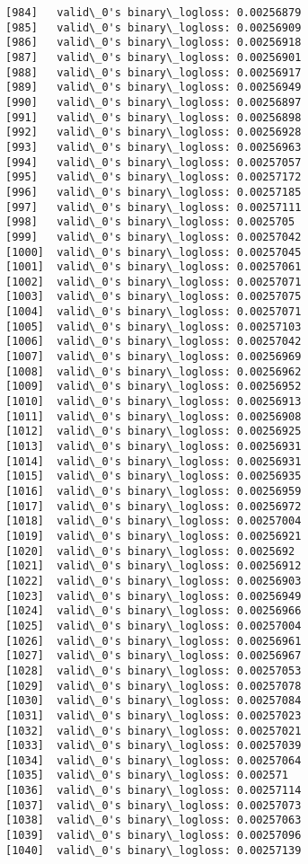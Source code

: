 \documentclass[11pt]{article}
\begin{document}
\begin{Verbatim}[commandchars=\\\{\}]
[984]	valid\_0's binary\_logloss: 0.00256879
[985]	valid\_0's binary\_logloss: 0.00256909
[986]	valid\_0's binary\_logloss: 0.00256918
[987]	valid\_0's binary\_logloss: 0.00256901
[988]	valid\_0's binary\_logloss: 0.00256917
[989]	valid\_0's binary\_logloss: 0.00256949
[990]	valid\_0's binary\_logloss: 0.00256897
[991]	valid\_0's binary\_logloss: 0.00256898
[992]	valid\_0's binary\_logloss: 0.00256928
[993]	valid\_0's binary\_logloss: 0.00256963
[994]	valid\_0's binary\_logloss: 0.00257057
[995]	valid\_0's binary\_logloss: 0.00257172
[996]	valid\_0's binary\_logloss: 0.00257185
[997]	valid\_0's binary\_logloss: 0.00257111
[998]	valid\_0's binary\_logloss: 0.0025705
[999]	valid\_0's binary\_logloss: 0.00257042
[1000]	valid\_0's binary\_logloss: 0.00257045
[1001]	valid\_0's binary\_logloss: 0.00257061
[1002]	valid\_0's binary\_logloss: 0.00257071
[1003]	valid\_0's binary\_logloss: 0.00257075
[1004]	valid\_0's binary\_logloss: 0.00257071
[1005]	valid\_0's binary\_logloss: 0.00257103
[1006]	valid\_0's binary\_logloss: 0.00257042
[1007]	valid\_0's binary\_logloss: 0.00256969
[1008]	valid\_0's binary\_logloss: 0.00256962
[1009]	valid\_0's binary\_logloss: 0.00256952
[1010]	valid\_0's binary\_logloss: 0.00256913
[1011]	valid\_0's binary\_logloss: 0.00256908
[1012]	valid\_0's binary\_logloss: 0.00256925
[1013]	valid\_0's binary\_logloss: 0.00256931
[1014]	valid\_0's binary\_logloss: 0.00256931
[1015]	valid\_0's binary\_logloss: 0.00256935
[1016]	valid\_0's binary\_logloss: 0.00256959
[1017]	valid\_0's binary\_logloss: 0.00256972
[1018]	valid\_0's binary\_logloss: 0.00257004
[1019]	valid\_0's binary\_logloss: 0.00256921
[1020]	valid\_0's binary\_logloss: 0.0025692
[1021]	valid\_0's binary\_logloss: 0.00256912
[1022]	valid\_0's binary\_logloss: 0.00256903
[1023]	valid\_0's binary\_logloss: 0.00256949
[1024]	valid\_0's binary\_logloss: 0.00256966
[1025]	valid\_0's binary\_logloss: 0.00257004
[1026]	valid\_0's binary\_logloss: 0.00256961
[1027]	valid\_0's binary\_logloss: 0.00256967
[1028]	valid\_0's binary\_logloss: 0.00257053
[1029]	valid\_0's binary\_logloss: 0.00257078
[1030]	valid\_0's binary\_logloss: 0.00257084
[1031]	valid\_0's binary\_logloss: 0.00257023
[1032]	valid\_0's binary\_logloss: 0.00257021
[1033]	valid\_0's binary\_logloss: 0.00257039
[1034]	valid\_0's binary\_logloss: 0.00257064
[1035]	valid\_0's binary\_logloss: 0.002571
[1036]	valid\_0's binary\_logloss: 0.00257114
[1037]	valid\_0's binary\_logloss: 0.00257073
[1038]	valid\_0's binary\_logloss: 0.00257063
[1039]	valid\_0's binary\_logloss: 0.00257096
[1040]	valid\_0's binary\_logloss: 0.00257139

\end{Verbatim}
\end{document}
